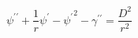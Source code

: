 \begin{equation}
\psi ^{\prime \prime}+\frac{1}{r} \psi ^{\prime} - {\psi ^{\prime}}^2 - \gamma ^{\prime \prime} = \frac{D^2}{r^2}
\end{equation}

